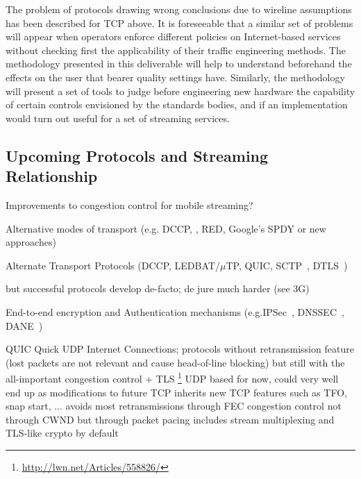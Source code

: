 The problem of protocols drawing wrong conclusions due to wireline assumptions has been described for \gls{TCP} above. It is foreseeable that a similar set of problems will appear when operators enforce different policies on Internet-based services without checking first the applicability of their traffic engineering methods. The methodology presented in this deliverable will help to understand beforehand the effects on the user that bearer quality settings have. Similarly, the methodology will present a set of tools to judge before engineering new hardware the capability of certain controls envisioned by the standards bodies, and if an implementation would turn out useful for a set of streaming services.










\subsection{Upcoming Protocols and Streaming Relationship}

Improvements to congestion control for mobile streaming?


 Alternative modes of transport (e.g. DCCP, , RED, Google's SPDY or new approaches)

 Alternate Transport Protocols (DCCP\cite{rfc4340}, LEDBAT\cite{rfc6817}/$\mu$TP\cite{bt2010utp}, QUIC, SCTP~\cite{rfc4960}, DTLS~\cite{rfc6347})

but successful protocols develop de-facto; de jure much harder (see \gls{3G})



 End-to-end encryption and Authentication mechanisms (e.g.IPSec~\cite{rfc4301}, DNSSEC~\cite{rfc4033}, \gls{DANE}~\cite{rfc6698})


\gls{QUIC}  Quick UDP Internet Connections; protocols without retransmission feature (lost packets are not relevant and cause head-of-line blocking) but still with the all-important congestion control + TLS
\footnote{\url{http://lwn.net/Articles/558826/}}
UDP based for now, could very well end up as modifications to future TCP
inherits new TCP features such as TFO, snap start, ...
avoids most retransmissions through FEC
congestion control not through CWND but through packet pacing
includes stream multiplexing and TLS-like crypto by default



